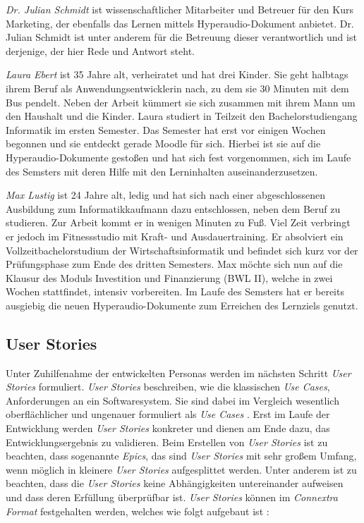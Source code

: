 {\Large\emph{Dr. Julian Schmidt}} ist wissenschaftlicher Mitarbeiter und Betreuer für den Kurs \glqq Marketing\grqq{}, der ebenfalls das Lernen mittels Hyperaudio-Dokument anbietet. Dr. Julian Schmidt ist unter anderem für die Betreuung dieser verantwortlich und ist derjenige, der hier Rede und Antwort steht.
\vspace{.5cm}

{\Large\emph{Laura Ebert}} ist 35 Jahre alt, verheiratet und hat drei Kinder. Sie geht halbtags ihrem Beruf als Anwendungsentwicklerin nach, zu dem sie 30 Minuten mit dem Bus pendelt. Neben der Arbeit kümmert sie sich zusammen mit ihrem Mann um den Haushalt und die Kinder. Laura studiert in Teilzeit den Bachelorstudiengang Informatik im ersten Semester. Das Semester hat erst vor einigen Wochen begonnen und sie entdeckt gerade Moodle für sich. Hierbei ist sie auf die Hyperaudio-Dokumente gestoßen und hat sich fest vorgenommen, sich im Laufe des Semsters mit deren Hilfe mit den Lerninhalten auseinanderzusetzen.
\vspace{.5cm}
 
{\Large\emph{Max Lustig}} ist 24 Jahre alt, ledig und hat sich nach einer abgeschlossenen Ausbildung zum Informatikkaufmann dazu entschlossen, neben dem Beruf zu studieren. Zur Arbeit kommt er in wenigen Minuten zu Fuß. Viel Zeit verbringt er jedoch im Fitnessstudio mit Kraft- und Ausdauertraining. Er absolviert ein Vollzeitbachelorstudium der Wirtschaftsinformatik und befindet sich kurz vor der Prüfungsphase zum Ende des dritten Semesters. Max möchte sich nun auf die Klausur des Moduls \glqq Investition und Finanzierung (BWL II)\grqq{}, welche in zwei Wochen stattfindet, intensiv vorbereiten. Im Laufe des Semsters hat er bereits ausgiebig die neuen Hyperaudio-Dokumente zum Erreichen des Lernziels genutzt.

\par
\endgroup

\subsection{User Stories}
\label{sec:UserStories}
Unter Zuhilfenahme der entwickelten Personas werden im nächsten Schritt \textit{User Stories} formuliert. \textit{User Stories} beschreiben, wie die klassischen \textit{Use Cases}, Anforderungen an ein Softwaresystem. Sie sind dabei im Vergleich wesentlich oberflächlicher und ungenauer formuliert als \textit{Use Cases} \citep{wirdemann2017scrum}. Erst im Laufe der Entwicklung werden \textit{User Stories} konkreter und dienen am Ende dazu, das Entwicklungsergebnis zu validieren. Beim Erstellen von \textit{User Stories} ist zu beachten, dass sogenannte \textit{Epics}, das sind \textit{User Stories} mit sehr großem Umfang, wenn möglich in kleinere \textit{User Stories} aufgesplittet werden. Unter anderem ist zu beachten, dass die \textit{User Stories} keine Abhängigkeiten untereinander aufweisen und dass deren Erfüllung überprüfbar ist. \textit{User Stories} können im \textit{Connextra Format} festgehalten werden, welches wie folgt aufgebaut ist \citep{cohn2004user}:

